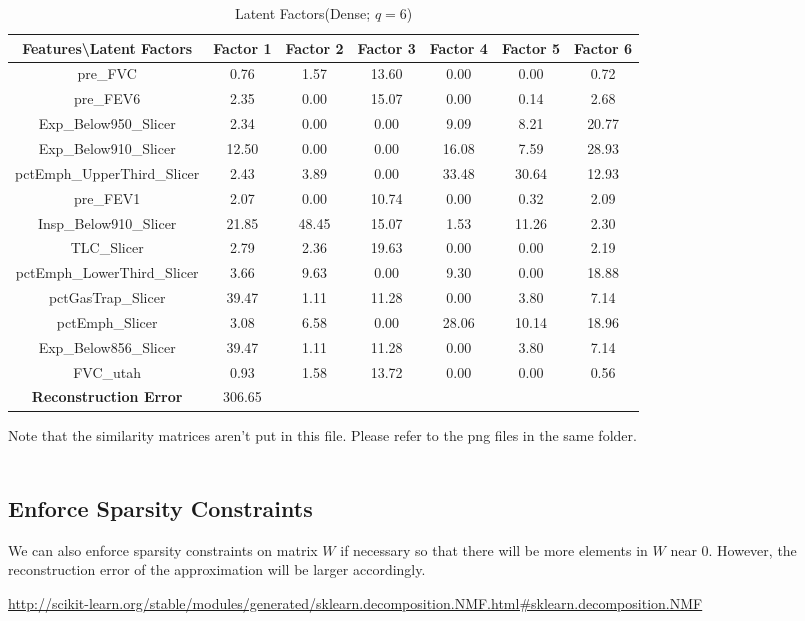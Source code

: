 \documentclass[11pt]{article}
\begin{document}
\begin{table}[ht]
\caption{Latent Factors(Dense; $q=6$)}
\centering
\begin{tabular}{c | c | c | c |c |c |c}
\hline\hline
Features\textbackslash Latent Factors & Factor 1 & Factor 2 & Factor 3 & Factor 4 & Factor 5 & Factor 6\\[1ex]
\hline
pre\_FVC  &  0.76  &  1.57  &  13.60  &  0.00  &  0.00  &  0.72 \\
pre\_FEV6  &  2.35  &  0.00  &  15.07  &  0.00  &  0.14  &  2.68 \\
Exp\_Below950\_Slicer  &  2.34  &  0.00  &  0.00  &  9.09  &  8.21  &  20.77 \\
Exp\_Below910\_Slicer  &  12.50  &  0.00  &  0.00  &  16.08  &  7.59  &  28.93 \\
pctEmph\_UpperThird\_Slicer  &  2.43  &  3.89  &  0.00  &  33.48  &  30.64  &  12.93 \\
pre\_FEV1  &  2.07  &  0.00  &  10.74  &  0.00  &  0.32  &  2.09 \\
Insp\_Below910\_Slicer  &  21.85  &  48.45  &  15.07  &  1.53  &  11.26  &  2.30 \\
TLC\_Slicer  &  2.79  &  2.36  &  19.63  &  0.00  &  0.00  &  2.19 \\
pctEmph\_LowerThird\_Slicer  &  3.66  &  9.63  &  0.00  &  9.30  &  0.00  &  18.88 \\
pctGasTrap\_Slicer  &  39.47  &  1.11  &  11.28  &  0.00  &  3.80  &  7.14 \\
pctEmph\_Slicer  &  3.08  &  6.58  &  0.00  &  28.06  &  10.14  &  18.96 \\
Exp\_Below856\_Slicer  &  39.47  &  1.11  &  11.28  &  0.00  &  3.80  &  7.14 \\
FVC\_utah  &  0.93  &  1.58  &  13.72  &  0.00  &  0.00  &  0.56 \\
\hline
\textbf{Reconstruction Error} & 306.65\\
\hline
\end{tabular}
\end{table}
Note that the similarity matrices aren't put in this file. Please refer to the png files in the same folder.\\
\\
\subsection{Enforce Sparsity Constraints}
We can also enforce sparsity constraints on matrix $W$ if necessary so that there will be more elements in $W$ near 0. However, the reconstruction error of the approximation will be larger accordingly.
\begin{thebibliography}{9}
\url{http://scikit-learn.org/stable/modules/generated/sklearn.decomposition.NMF.html#sklearn.decomposition.NMF}\\[-20pt]
\end{thebibliography}
\end{document}
